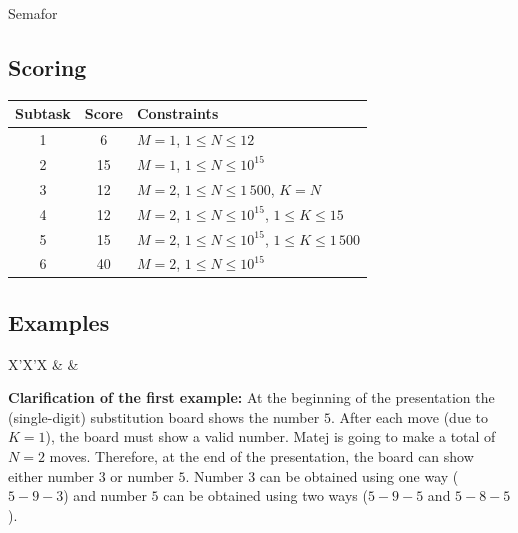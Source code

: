 \begin{statement}[
  problempoints=100,
  timelimit=4 seconds,
  memorylimit=512 MiB,
]{Semafor}
\subsection*{Scoring}
{\renewcommand{\arraystretch}{1.4}
  \setlength{\tabcolsep}{6pt}
  \begin{tabular}{ccl}
 Subtask & Score & Constraints \\ \midrule
  1 & 6 & $M=1$, $1 \le N \le 12$ \\
  2 & 15 & $M=1$, $1 \le N \le 10^{15}$ \\
  3 & 12 & $M=2$, $1 \le N \le 1\,500$, $K = N$\\
  4 & 12 & $M=2$, $1 \le N \le 10^{15}$, $1 \le K \le 15$ \\
  5 & 15 & $M=2$, $1 \le N \le 10^{15}$, $1 \le K \le 1\,500$ \\
  6 & 40 & $M=2$, $1 \le N \le 10^{15}$ \\
\end{tabular}}

\subsection*{Examples}
\begin{tabularx}{\textwidth}{X'X'X}
 &
 &
\end{tabularx}

\textbf{Clarification of the first example:}
At the beginning of the presentation the (single-digit) substitution board
shows the number $5$. After each move (due to $K=1$), the board must show
a valid number. Matej is going to make a total of $N=2$ moves. Therefore,
at the end of the presentation, the board can show either number $3$ or
number $5$. Number $3$ can be obtained using one way ($5-9-3$) and number $5$
can be obtained using two ways ($5-9-5$ and $5-8-5$).

\end{statement}

